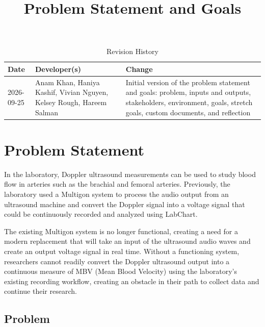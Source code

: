\documentclass{article}
\title{Problem Statement and Goals\\\progname}
\author{\authname}
\date{}
\begin{document}
\maketitle

\begin{table}[hp]
\caption{Revision History} \label{TblRevisionHistory}
\begin{tabularx}{\textwidth}{l>{\raggedright\arraybackslash}p{}>{\raggedright\arraybackslash}X}
\toprule
\textbf{Date} & \textbf{Developer(s)} & \textbf{Change}\\
\midrule
2026-09-25 & Anam Khan, Haniya Kashif, Vivian Nguyen, Kelsey Rough, Hareem Salman
& Initial version of the problem statement and goals: problem, inputs and
outputs, stakeholders, environment, goals, stretch goals, custom documents, and
reflection\\
\bottomrule
\end{tabularx}
\end{table}

\section{Problem Statement}



In the laboratory, Doppler ultrasound measurements can be used to study blood flow in arteries such as the brachial and femoral arteries. Previously, the laboratory used a Multigon system to process the audio output from an ultrasound machine and convert the Doppler signal into a voltage signal that could be continuously recorded and analyzed using LabChart.

The existing Multigon system is no longer functional, creating a need for a modern replacement that will take an input of the ultrasound audio waves and create an output voltage signal in real time. Without a functioning system, researchers cannot readily convert the Doppler ultrasound output into a continuous measure of MBV (Mean Blood Velocity) using the laboratory's existing recording workflow, creating an obstacle in their path to collect data and continue their research.

\subsection{Problem}
\end{document}
